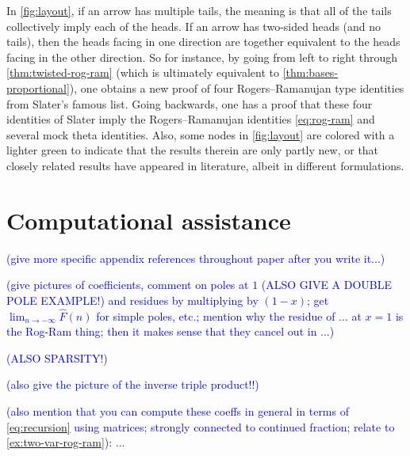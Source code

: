 \documentclass[reqno,11pt]{amsart}
\theoremstyle{definition}
\theoremstyle{remark}
\numberwithin{equation}{section}
\renewcommand{\hat}{\widehat}
\newcommand{\fix}[1]{\textcolor{blue}{\large (#1)\normalsize}}
\begin{document}
In \cref{fig:layout}, if an arrow has multiple tails, the meaning is that all of the tails collectively imply each of the heads. If an arrow has two-sided heads (and no tails), then the heads facing in one direction are together equivalent to the heads facing in the other direction. So for instance, by going from left to right through \cref{thm:twisted-rog-ram} (which is ultimately equivalent to \cref{thm:bases-proportional}), one obtains a new proof of four Rogers--Ramanujan type identities from Slater's famous list. Going backwards, one has a proof that these four identities of Slater imply the Rogers--Ramanujan identities \cref{eq:rog-ram} and several mock theta identities. Also, some nodes in \cref{fig:layout} are colored with a lighter green to indicate that the results therein are only partly new, or that closely related results have appeared in literature, albeit in different formulations.
\fi

\newpage







\iffalse
\appendix
\section{Computational assistance}\label{app:comput-assistance}

\fix{give more specific appendix references throughout paper after you write it...}

\fix{give pictures of coefficients, comment on poles at $1$ (ALSO GIVE A DOUBLE POLE EXAMPLE!) and residues by multiplying by $(1 - x)$; get $\lim_{n \to -\infty} \hat{F}(n)$ for simple poles, etc.; mention why the residue of ... at $x = 1$ is the Rog-Ram thing; then it makes sense that they cancel out in ...}

\fix{ALSO SPARSITY!}

\fix{also give the picture of the inverse triple product!!}

\fix{also mention that you can compute these coeffs in general in terms of \cref{eq:recursion} using matrices; strongly connected to continued fraction; relate to \cref{ex:two-var-rog-ram}}: ...
\end{document}
